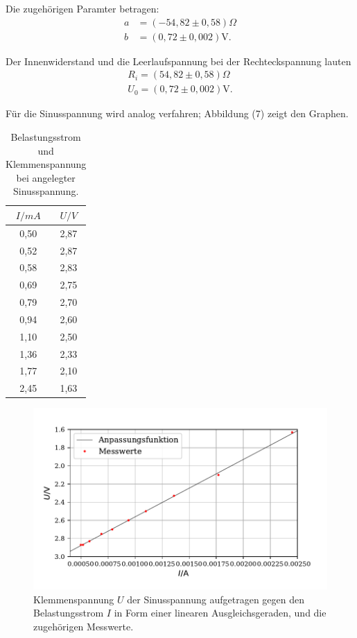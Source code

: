 Die zugehörigen Paramter betragen:
\begin{align*}
a &= (-54,82 \pm 0,58)\Omega \\
b &= (0,72 \pm 0,002)\si{\volt} .
\end{align*}

Der Innenwiderstand und die Leerlaufspannung bei der Rechteckspannung lauten\begin{align*}
R_i = (54,82 \pm 0,58)\Omega \\
U_0 =  (0,72 \pm 0,002)\si{\volt} .
\end{align*}

Für die Sinusspannung wird analog verfahren; Abbildung (7) zeigt den Graphen.

\begin{table}[H]
  \centering
  \caption{Belastungsstrom und Klemmenspannung bei angelegter Sinusspannung.}
  \begin{tabular}{c c}
    \toprule
     $I/mA$ & $U/V$  \\
    \midrule
    0,50 & 2,87 \\
    0,52 & 2,87 \\
    0,58 & 2,83 \\
    0,69 & 2,75 \\
    0,79 & 2,70 \\
    0,94 & 2,60 \\
    1,10 & 2,50 \\
    1,36 & 2,33 \\
    1,77 & 2,10 \\
    2,45 & 1,63 \\
  \bottomrule
  \end{tabular}
\end{table}

\begin{figure}[H]
  \centering
  \includegraphics{plot4.pdf}
  \caption{Klemmenspannung $U$ der Sinusspannung aufgetragen gegen den Belastungsstrom $I$ in Form einer linearen Ausgleichsgeraden, und die zugehörigen Messwerte.}
  \label{fig:rechteck}
\end{figure}

